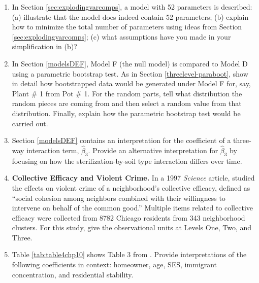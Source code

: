 \documentclass[
]{krantz}
\begin{document}
\begin{enumerate}
\item
  In Section \ref{sec:explodingvarcomps}, a model with 52 parameters is described: (a) illustrate that the model does indeed contain 52 parameters; (b) explain how to minimize the total number of parameters using ideas from Section \ref{sec:explodingvarcomps}; (c) what assumptions have you made in your simplification in (b)?
\item
  In Section \ref{modelsDEF}, Model F (the null model) is compared to Model D using a parametric bootstrap test. As in Section \ref{threelevel-paraboot}, show in detail how bootstrapped data would be generated under Model F for, say, Plant \# 1 from Pot \# 1. For the random parts, tell what distribution the random pieces are coming from and then select a random value from that distribution. Finally, explain how the parametric bootstrap test would be carried out.
\item
  Section \ref{modelsDEF} contains an interpretation for the coefficient of a three-way interaction term, \(\hat{\beta}_{3}\). Provide an alternative interpretation for \(\hat{\beta}_{3}\) by focusing on how the sterilization-by-soil type interaction differs over time.
\item
  \textbf{Collective Efficacy and Violent Crime.} In a 1997 \emph{Science} article, \citet{Sampson1997} studied the effects on violent crime of a neighborhood's collective efficacy, defined as ``social cohesion among neighbors combined with their willingness to intervene on behalf of the common good.'' Multiple items related to collective efficacy were collected from 8782 Chicago residents from 343 neighborhood clusters. For this study, give the observational units at Levels One, Two, and Three.
\item
  Table \ref{tab:table4chp10} shows Table 3 from \citet{Sampson1997}. Provide interpretations of the following coefficients in context: homeowner, age, SES, immigrant concentration, and residential stability.
\end{enumerate}
\end{document}
